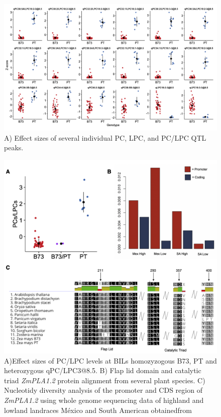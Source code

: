 \documentclass[9pt,twocolumn,twoside]{BioRxiv}
\begin{document}
\begin{figure}[t]
\begin{center}
\includegraphics[width=0.8\paperwidth]{Sup_Figures/Sup_Fig_4.png}
\caption{A) Effect sizes of several individual PC, LPC, and PC/LPC QTL peaks.
}
\label{SupFig3}
\end{center}
\end{figure} 

\begin{figure}[t]
\begin{center}
\includegraphics[width=0.8\paperwidth]{Sup_Figures/Sup_Fig_5.png}
\caption{A)Effect sizes of PC/LPC levels at BILs homozyzogous B73, PT and heterozygous qPC/LPC3@8.5.
B) Flap lid domain and catalytic triad \textit{ZmPLA1.2} protein alignment from several plant species. 
C) Nucleotidy diversity analysis of the promoter and CDS region of \textit{ZmPLA1.2} using whole genome sequencing data of highland and lowland landraces México and South American obtainedfrom \cite{Wang2017-bc}
}
\label{SupFig6}
\end{center}
\end{figure} 
\end{document}
